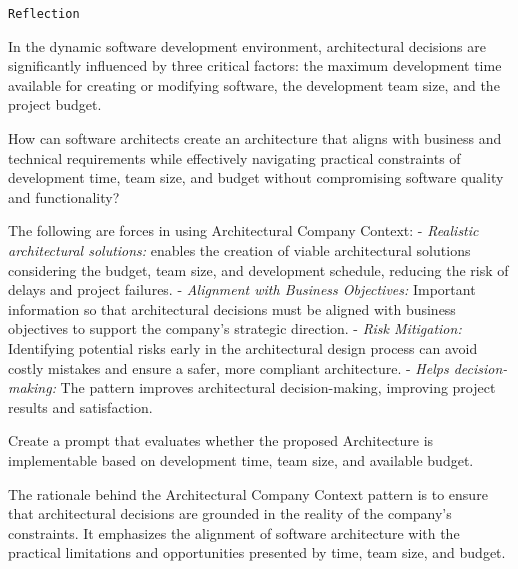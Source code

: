  \texttt{Reflection}

 In the dynamic software development environment, architectural decisions are significantly influenced by three critical factors: the maximum development time available for creating or modifying software, the development team size, and the project budget.

How can software architects create an architecture that aligns with business and technical requirements while effectively navigating practical constraints of development time, team size, and budget without compromising software quality and functionality?

 The following are forces in using Architectural Company Context:
\newline
- \textit{Realistic architectural solutions:} enables the creation of viable architectural solutions considering the budget, team size, and development schedule, reducing the risk of delays and project failures.
\newline
- \textit{Alignment with Business Objectives:} Important information so that architectural decisions must be aligned with business objectives to support the company's strategic direction.
\newline
- \textit{Risk Mitigation:} Identifying potential risks early in the architectural design process can avoid costly mistakes and ensure a safer, more compliant architecture.
\newline
- \textit{Helps decision-making:} The pattern improves architectural decision-making, improving project results and satisfaction.


Create a prompt that evaluates whether the proposed Architecture is implementable based on development time, team size, and available budget. 

 The rationale behind the Architectural Company Context pattern is to ensure that architectural decisions are grounded in the reality of the company's constraints. It emphasizes the alignment of software architecture with the practical limitations and opportunities presented by time, team size, and budget.
 

